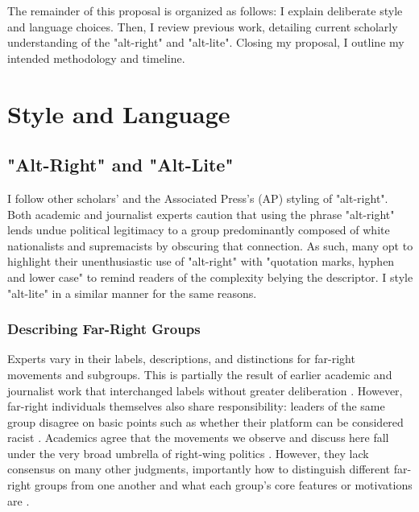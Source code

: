 \documentclass[acmlarge, screen, authorversion]{acmart}
\begin{document}
\medskip

The remainder of this proposal is organized as follows: I explain deliberate style and language
choices. Then, I review previous work, detailing current scholarly understanding of the "alt-right"
and "alt-lite". Closing my proposal, I outline my intended methodology and timeline.

\section{Style and Language}

\subsection{"Alt-Right" and "Alt-Lite"}

I follow other scholars’ \cite{hartzellAltWhiteConceptualizingAltRight, massanariRethinkingResearchEthics2018} and the
Associated Press’s (AP) \cite{johndaniszewskiWritingAltright2016} styling of "alt-right".
Both academic and journalist experts caution that using the
phrase "alt-right" lends undue political legitimacy to a group predominantly
composed of white nationalists and supremacists by obscuring that
connection. As such, many opt to highlight their unenthusiastic use of
"alt-right" with "quotation marks, hyphen and lower case"
\cite{johndaniszewskiWritingAltright2016} to remind readers of the complexity belying the
descriptor. I style "alt-lite" in a similar manner for the same reasons.

\subsubsection{Describing Far-Right Groups}

Experts vary in their labels, descriptions, and distinctions for far-right movements and
subgroups. This is partially the result of earlier academic and journalist work
that interchanged labels without greater deliberation
\cite{muddeFarRightToday2019}. However,
far-right individuals themselves also share responsibility:
leaders of the same group disagree on basic points
such as whether their platform can be considered racist \cite{muddeFarRightToday2019}.
Academics agree that the movements we observe and discuss here fall under the very broad umbrella of right-wing politics \cite{muddeFarRightToday2019}. However, they lack consensus on many other judgments, importantly how to distinguish different far-right groups from one another and what each group's core features or motivations are \cite{muddeFarRightToday2019}.
\end{document}
